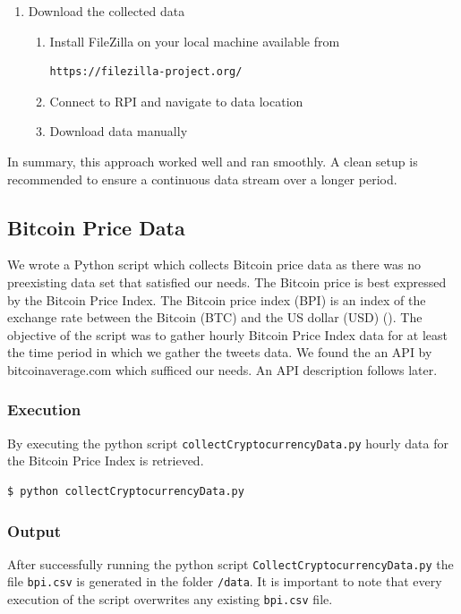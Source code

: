 \documentclass[a4paper,12pt]{article}
\begin{document}
\begin{spacing}{1.2}
\begin{enumerate}
\item Download the collected data
\begin{enumerate}
\item Install FileZilla on your local machine available from
\begin{lstlisting}[language=bash] 
https://filezilla-project.org/
\end{lstlisting}
\item Connect to RPI and navigate to data location \newline
\item Download data manually \newline \newline \end{enumerate}
\end{enumerate}

In summary, this approach worked well and ran smoothly. A clean setup is recommended to ensure a continuous data stream over a longer period.


\subsection{Bitcoin Price Data}
We wrote a Python script which collects Bitcoin price data as there was no preexisting data set that satisfied our needs. The Bitcoin price is best expressed by the Bitcoin Price Index. The Bitcoin price index (BPI) is an index of the exchange rate between the Bitcoin (BTC) and the US dollar (USD) (\cite{kristoufek2015main}). The objective of the script was to gather hourly Bitcoin Price Index data for at least the time period in which we gather the tweets data. We found the an API by bitcoinaverage.com which sufficed our needs. An API description follows later.

\subsubsection{Execution}
By executing the python script \verb|collectCryptocurrencyData.py| hourly data for the Bitcoin Price Index is retrieved.
\begin{lstlisting}[language=bash]
    $ python collectCryptocurrencyData.py
\end{lstlisting}

\subsubsection{Output}
After successfully running the python script \verb|CollectCryptocurrencyData.py| the file \verb|bpi.csv| is generated in the folder \verb|/data|. It is important to note that every execution of the script overwrites any existing \verb|bpi.csv| file.


\end{spacing}
\end{document}
